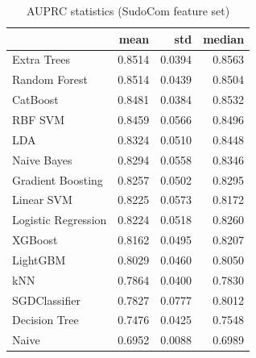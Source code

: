 \begin{table}
\caption{AUPRC statistics (SudoCom feature set)}
\label{tab:auprc_SudoCom_stats}
\begin{tabular}{lrrr}
\toprule
 & mean & std & median \\
\midrule
Extra Trees & 0.8514 & 0.0394 & 0.8563 \\
Random Forest & 0.8514 & 0.0439 & 0.8504 \\
CatBoost & 0.8481 & 0.0384 & 0.8532 \\
RBF SVM & 0.8459 & 0.0566 & 0.8496 \\
LDA & 0.8324 & 0.0510 & 0.8448 \\
Naive Bayes & 0.8294 & 0.0558 & 0.8346 \\
Gradient Boosting & 0.8257 & 0.0502 & 0.8295 \\
Linear SVM & 0.8225 & 0.0573 & 0.8172 \\
Logistic Regression & 0.8224 & 0.0518 & 0.8260 \\
XGBoost & 0.8162 & 0.0495 & 0.8207 \\
LightGBM & 0.8029 & 0.0460 & 0.8050 \\
kNN & 0.7864 & 0.0400 & 0.7830 \\
SGDClassifier & 0.7827 & 0.0777 & 0.8012 \\
Decision Tree & 0.7476 & 0.0425 & 0.7548 \\
Naive & 0.6952 & 0.0088 & 0.6989 \\
\bottomrule
\end{tabular}
\end{table}
